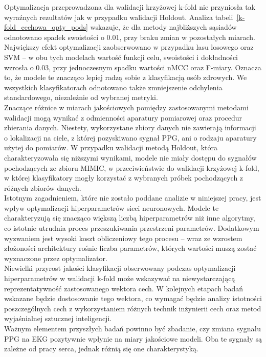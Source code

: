 \documentclass[a4paper,twoside,12pt]{book}
\begin{document}
\newpage
Optymalizacja przeprowadzona dla walidacji krzyżowej k-fold nie przyniosła tak wyraźnych rezultatów jak w przypadku walidacji Holdout. Analiza tabeli~\ref{k-fold_cechowa_opty_pods} wskazuje, że dla metody najbliższych sąsiadów odnotowano spadek swoistości o 0.01, przy braku zmian w pozostałych miarach. Największy efekt optymalizacji zaobserwowano w przypadku lasu losowego oraz SVM -- w obu tych modelach wartość funkcji celu, swoistości i dokładności wzrosła o 0.03, przy jednoczesnym spadku wartości nMCC oraz F-miary. Oznacza to, że modele te znacząco lepiej radzą sobie z klasyfikacją osób zdrowych. We wszystkich klasyfikatorach odnotowano także zmniejszenie odchylenia standardowego, niezależnie od wybranej metryki.\\

Znaczące różnice w miarach jakościowych pomiędzy zastosowanymi metodami walidacji mogą wynikać z odmienności aparatury pomiarowej oraz procedur zbierania danych. Niestety, wykorzystane zbiory danych nie zawierają informacji o lokalizacji na ciele, z której pozyskiwano sygnał PPG, ani o rodzaju aparatury użytej do pomiarów. W przypadku walidacji metodą Holdout, która charakteryzowała się niższymi wynikami, modele nie miały dostępu do sygnałów pochodzących ze zbioru MIMIC, w przeciwieństwie do walidacji krzyżowej k-fold, w której klasyfikatory mogły korzystać z wybranych próbek pochodzących z różnych zbiorów danych.\\


Istotnym zagadnieniem, które nie zostało poddane analizie w niniejszej pracy, jest wpływ optymalizacji hiperparametrów sieci neuronowych. Modele te charakteryzują się znacząco większą liczbą hiperparametrów niż inne algorytmy, co istotnie utrudnia proces przeszukiwania przestrzeni parametrów. Dodatkowym wyzwaniem jest wysoki koszt obliczeniowy tego procesu -- wraz ze wzrostem złożoności architektury rośnie liczba parametrów, których wartości muszą zostać wyznaczone przez optymalizator.\\

Niewielki przyrost jakości klasyfikacji obserwowany podczas optymalizacji hiperparametrów w walidacji k-fold może wskazywać na niewystarczającą reprezentatywność zastosowanego wektora cech. W kolejnych etapach badań wskazane będzie dostosowanie tego wektora, co wymagać będzie analizy istotności poszczególnych cech z wykorzystaniem różnych technik inżynierii cech oraz metod wyjaśnialnej sztucznej inteligencji.\\

Ważnym elementem przyszłych badań powinno być zbadanie, czy zmiana sygnału PPG na EKG pozytywnie wpłynie na miary jakościowe modeli. Oba te sygnały są zależne od pracy serca, jednak różnią się one charakterystyką.\\
\end{document}
